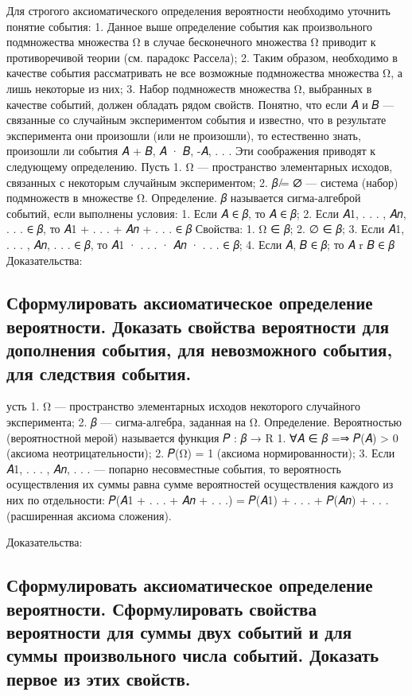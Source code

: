 Для строгого аксиоматического определения вероятности необходимо уточнить понятие события:
1. Данное выше определение события как произвольного подмножества множества Ω в случае бесконечного множества Ω приводит к противоречивой теории (см. парадокс Рассела); 
2. Таким образом, необходимо в качестве события рассматривать не все возможные подмножества множества Ω, а лишь некоторые из них;
3. Набор подмножеств множества Ω, выбранных в качестве событий, должен обладать рядом свойств. Понятно, что если 𝐴 и 𝐵 — связанные со случайным экспериментом события и известно, что в результате эксперимента они произошли (или не произошли), то естественно знать, произошли ли события 𝐴 + 𝐵, 𝐴 · 𝐵, -𝐴,  . . .
Эти соображения приводят к следующему определению. Пусть 
1. Ω — пространство элементарных исходов, связанных с некоторым случайным экспериментом; 
2. 𝛽 ̸= ∅ — система (набор) подмножеств в множестве Ω.
Определение. 𝛽 называется сигма-алгеброй событий, если выполнены условия: 
1. Если 𝐴 ∈ 𝛽, то 𝐴 ∈ 𝛽; 
2. Если 𝐴1, . . . , 𝐴𝑛, . . . ∈ 𝛽, то 𝐴1 + . . . + 𝐴𝑛 + . . . ∈ 𝛽
Свойства:
1. Ω ∈ 𝛽; 
2. ∅ ∈ 𝛽; 
3. Если 𝐴1, . . . , 𝐴𝑛, . . . ∈ 𝛽, то 𝐴1 · . . . · 𝐴𝑛 · . . . ∈ 𝛽; 
4. Если 𝐴, 𝐵 ∈ 𝛽; то 𝐴 r 𝐵 ∈ 𝛽
Доказательства:

\subsection{Сформулировать аксиоматическое определение вероятности. Доказать свойства вероятности для дополнения события, для невозможного события, для следствия события.}

усть 
1. Ω — пространство элементарных исходов некоторого случайного эксперимента;
2. 𝛽 — сигма-алгебра, заданная на Ω.
Определение. Вероятностью (вероятностной мерой) называется функция
𝑃 : 𝛽 → R
1. ∀𝐴 ∈ 𝛽 =⇒ 𝑃(𝐴) > 0 (аксиома неотрицательности); 
2. 𝑃(Ω) = 1 (аксиома нормированности); 
3. Если 𝐴1, . . . , 𝐴𝑛, . . . — попарно несовместные события, то вероятность осуществления их суммы равна сумме вероятностей осуществления каждого из них по отдельности: 𝑃(𝐴1 + . . . + 𝐴𝑛 + . . .) = 𝑃(𝐴1) + . . . + 𝑃(𝐴𝑛) + . . . (расширенная аксиома сложения).



Доказательства:

\subsection{Сформулировать аксиоматическое определение вероятности. Сформулировать свойства вероятности для суммы двух событий и для суммы произвольного числа событий. Доказать первое из этих свойств.}

